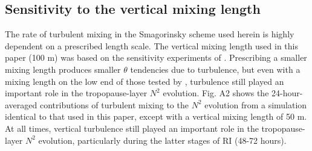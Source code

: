 \documentclass{ametsoc}
\begin{document}
 \subsection{Sensitivity to the vertical mixing length}
The rate of turbulent mixing in the Smagorinsky scheme used herein is highly dependent on a prescribed length scale.
The vertical mixing length used in this paper (100 m) was based on the sensitivity experiments of \cite{Bryan2012}.
Prescribing a smaller mixing length produces smaller $\theta$ tendencies due to turbulence, but even with a mixing length on the low end of those tested by \cite{Bryan2012}, turbulence still played an important role in the tropopause-layer $N^2$ evolution.
Fig. A2 shows the 24-hour-averaged contributions of turbulent mixing to the $N^2$ evolution from a simulation identical to that used in this paper, except with a vertical mixing length of 50 m.
At all times, vertical turbulence still played an important role in the tropopause-layer $N^2$ evolution, particularly during the latter stages of RI (48-72 hours).



%

%
%
 
 

%
\end{document}
